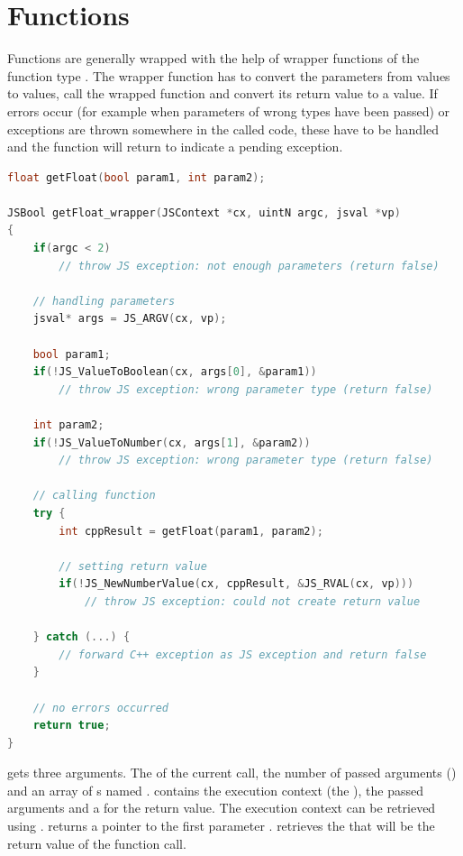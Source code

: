 \section{Functions}
\label{sec:Functions}

Functions are generally wrapped with the help of wrapper functions of the function type . The wrapper function has to convert the parameters from  values to  values, call the wrapped function and convert its return value to a  value. If errors occur (for example when parameters of wrong types have been passed) or exceptions are thrown somewhere in the called  code, these have to be handled and the function will return  to indicate a pending  exception.

\SingleSpacing
\begin{lstlisting}[language=C++, caption=A simple wrapper function]
float getFloat(bool param1, int param2);

JSBool getFloat_wrapper(JSContext *cx, uintN argc, jsval *vp)
{
	if(argc < 2)
		// throw JS exception: not enough parameters (return false)

	// handling parameters
	jsval* args = JS_ARGV(cx, vp);

	bool param1;
	if(!JS_ValueToBoolean(cx, args[0], &param1))
		// throw JS exception: wrong parameter type (return false)
	
	int param2;
	if(!JS_ValueToNumber(cx, args[1], &param2))
		// throw JS exception: wrong parameter type (return false)

	// calling function
	try {	
		int cppResult = getFloat(param1, param2);
		
		// setting return value
		if(!JS_NewNumberValue(cx, cppResult, &JS_RVAL(cx, vp)))
			// throw JS exception: could not create return value
		
	} catch (...) {
		// forward C++ exception as JS exception and return false
	}

	// no errors occurred
	return true;
}
\end{lstlisting}
\OnehalfSpacing

 gets three arguments. The  of the current call, the number of passed arguments () and an array of s named .  contains the execution context (the ), the passed arguments and a  for the return value. The execution context can be retrieved using .  returns a pointer to the first parameter .  retrieves the  that will be the return value of the function call.

